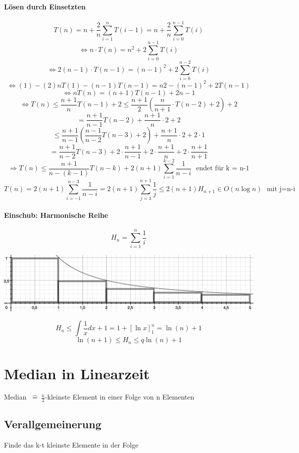 \paragraph{Lösen durch Einsetzten}
\[T(n) = n + \frac{2}{n} \sum_{i=1}^n T(i-1) = n + \frac{2}{n} \sum_{i=0}^{n-1} T(i)\]
\[ \Leftrightarrow n \cdot T(n) = n^2 + 2 \sum_{i=0}^{n-1} T(i) \]
\[ \Leftrightarrow 2(n-1) \cdot T(n-1) = (n-1)^2 + 2 \sum_{i=0}^{n-2} T(i) \]
\[ \Leftrightarrow (1)-(2) n T(1)-(n-1) T(n-1) = n2 -(n-1)^2 + 2 T(n-1) \]
\[ \Leftrightarrow n T(n) = (n+1) T(n-1) + 2n-1 \]
\[ \Leftrightarrow T(n) \leq \frac{n+1}{n} T(n-1) + 2 \leq \frac{n+1}{2} \left(\frac{n}{n+1} \cdot T(n-2) + 2 \right) + 2 \]
\[ = \frac{n+1}{n-1} T(n-2) + \frac{n+1}{n} \cdot 2 + 2\]
\[ \leq \frac{n+1}{n-1} \left(\frac{n-1}{n-2} T(n-3) +2 \right) + \frac{n+1}{n} \cdot 2 + 2 \cdot 1\]
\[= \frac{n+1}{n-2} T(n-3) + 2 \cdot \frac{n+1}{n-1} + 2 \cdot \frac{n+1}{n} + 2 \cdot \frac{n+1}{n+1} \]
\[ \Rightarrow T(n) \leq \frac{n+1}{n-(k-1)} T(n-k) + 2(n+1) \sum_{i=1}^{k-2} \frac{1}{n-i} ~~~\text{endet für k = n-1}\]
\[ T(n) = 2(n+1) \sum_{i=-1}^{n-3} \frac{1}{n-i} = 2(n+1) \sum_{j=3}^{n+1} \frac{1}{j} \leq 2 (n+1) H_{n+1} \in O(n \log n) ~~~\text{mit j=n-i} \] 

\begin{mdframed}
\paragraph{Einschub: Harmonische Reihe}
\[ H_n = \sum_{i=1}^{n} \frac{1}{i} \]

\includegraphics[width=\linewidth]{06/Grafik/img4.png}


\[H_n \leq \int \frac{1}{x} dx +1 = 1 + [\ln x]_1^n = \ln(n)+1 \]
\[\ln(n+1) \leq H_n \le	q \ln(n)+1 \]
\end{mdframed}

\pagebreak 

\section{Median in Linearzeit}
Median  $~\hat{=}~ \frac{n}{2} $-kleinste Element in einer Folge von n Elementen

\subsection*{Verallgemeinerung}
Finde das k-t kleinste Elemente in der Folge\\

